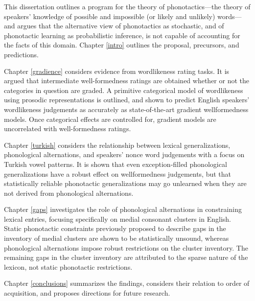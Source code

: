 
This dissertation outlines a program for the theory of phonotactics---the theory of speakers' knowledge of possible and impossible (or likely and unlikely) words---and argues that the alternative view of phonotactics as stochastic, and of phonotactic learning as probabilistic inference, is not capable of accounting for the facts of this domain.
Chapter \ref{intro} outlines the proposal, precursors, and predictions.

Chapter \ref{gradience} considers evidence from wordlikeness rating tasks. It is argued that intermediate well-formedness ratings are obtained whether or not the categories in question are graded. 
A primitive categorical model of wordlikeness using prosodic representations is outlined, and shown to predict English speakers' wordlikeness judgements as accurately as state-of-the-art gradient wellformedness models. 
Once categorical effects are controlled for, gradient models are uncorrelated with well-formedness ratings.

Chapter \ref{turkish} considers the relationship between lexical generalizations, phonological alternations, and speakers' nonce word judgements with a focus on Turkish vowel patterns. 
It is shown that even exception-filled phonological generalizations have a robust effect on wellformedness judgements, but that statistically reliable phonotactic generalizations may go unlearned when they are not derived from phonological alternations.

Chapter \ref{gaps} investigates the role of phonological alternations in constraining lexical entries, focusing specifically on medial consonant clusters in English. 
Static phonotactic constraints previously proposed to describe gaps in the inventory of medial clusters are shown to be statistically unsound, whereas phonological alternations impose robust restrictions on the cluster inventory. 
The remaining gaps in the cluster inventory are attributed to the sparse nature of the lexicon, not static phonotactic restrictions.

Chapter \ref{conclusions} summarizes the findings, considers their relation to order of acquisition, and proposes directions for future research.
